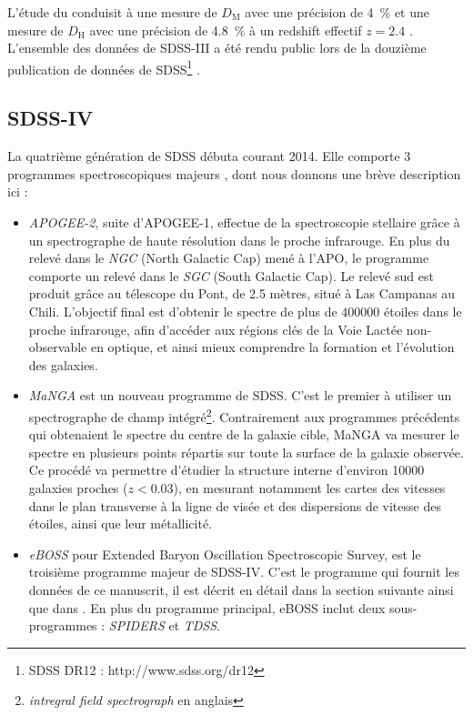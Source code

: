 L'étude du \lya{} conduisit à une mesure de $D_{\mathrm{M}}$ avec une précision de \SI{4}{\percent} et une mesure de $D_{\mathrm{H}}$ avec une précision de \SI{4.8}{\percent} à un redshift effectif $z=\num{2,4}$ \autocite{DuMasdesBourboux2017}.
L'ensemble des données de SDSS-III a été rendu public lors de la douzième publication de données de SDSS\footnote{SDSS DR12 : http://www.sdss.org/dr12} \autocite{Alam2015}.


\subsection{SDSS-IV}

La quatrième génération de SDSS débuta courant 2014. Elle comporte 3 programmes spectroscopiques majeurs \autocite{Blanton2017}, dont nous donnons une brève description ici :
\begin{itemize}
\item \emph{APOGEE-2}, suite d'APOGEE-1, effectue de la spectroscopie stellaire grâce à un spectrographe de haute résolution dans le proche infrarouge. En plus du relevé dans le \emph{NGC} (North Galactic Cap) mené à l'APO, le programme comporte un relevé dans le \emph{SGC} (South Galactic Cap). Le relevé sud est produit grâce au télescope du Pont, de \num{2,5} mètres, situé à Las Campanas au Chili. L'objectif final est d'obtenir le spectre de plus de \num{400000} étoiles dans le proche infrarouge, afin d'accéder aux régions clés de la Voie Lactée non-observable en optique, et ainsi mieux comprendre la formation et l'évolution des galaxies.
\item \emph{MaNGA} est un nouveau programme de SDSS. C'est le premier à utiliser un spectrographe de champ intégré\footnote{\emph{intregral field spectrograph} en anglais}. Contrairement aux programmes précédents qui obtenaient le spectre du centre de la galaxie cible, MaNGA va mesurer le spectre en plusieurs points répartis sur toute la surface de la galaxie observée. Ce procédé va permettre d'étudier la structure interne d'environ \num{10000} galaxies proches ($z < \num{0,03}$), en mesurant notamment les cartes des vitesses dans le plan transverse à la ligne de visée et des dispersions de vitesse des étoiles, ainsi que leur  métallicité.
\item \emph{eBOSS} pour Extended Baryon Oscillation Spectroscopic Survey, est le troisième programme majeur de SDSS-IV. C'est le programme qui fournit les données de ce manuscrit, il est décrit en détail dans la section suivante ainsi que dans \textcite{Dawson2015}. En plus du programme principal, eBOSS inclut deux sous-programmes : \emph{SPIDERS} et \emph{TDSS}.
  

\end{itemize}
